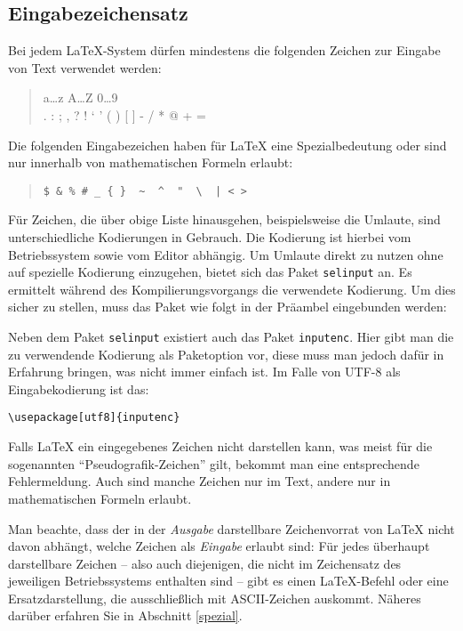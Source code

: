 \subsection{Eingabezeichensatz}\label{inputenc}

Bei jedem \LaTeX-System dürfen mindestens die folgenden Zeichen zur Eingabe von 
Text verwendet werden:
\begin{quote}
  \ttfamily
  a\dots z A\dots Z 0\dots 9 \\
  . : ; , ? ! ` ' ( ) [ ] - / * @ + =
\end{quote}
Die folgenden Eingabezeichen haben für \LaTeX{} eine Spezialbedeutung oder sind 
nur innerhalb von mathematischen Formeln erlaubt:
\begin{quote}
\verb.$ & % # _ { }  ~  ^  "  \  | < >.
\end{quote}
Für Zeichen, die über obige Liste hinausgehen, beispielsweise die Umlaute, sind 
unterschiedliche Kodierungen in
Gebrauch. Die Kodierung ist hierbei vom Betriebssystem sowie vom Editor 
abhängig. Um Umlaute direkt zu nutzen ohne auf spezielle Kodierung einzugehen,
bietet sich das Paket \texttt{selinput} an. Es ermittelt während des 
Kompilierungsvorgangs die verwendete Kodierung. Um dies sicher zu stellen, muss
das Paket wie folgt in der Präambel eingebunden werden:
\begin{example}[caption={Bestimmung der Kodierung für die Nutzung von Umlauten},]
 \usepackage{selinput}
 \usepackage[T1]{fontenc}
\end{example}

Neben dem Paket \texttt{selinput} existiert auch das Paket \texttt{inputenc}.
Hier gibt man die zu verwendende Kodierung als Paketoption vor, diese muss man
jedoch dafür in Erfahrung bringen, was nicht immer einfach ist. Im Falle von
UTF-8 als Eingabekodierung ist das:

\begin{beispiel}
	\lstinline+\usepackage[utf8]{inputenc}+
\end{beispiel}

Falls \LaTeX{} ein eingegebenes Zeichen nicht darstellen kann, was meist für die
sogenannten "`Pseudografik-Zeichen"' gilt,  bekommt man eine entsprechende 
Fehlermeldung. Auch sind manche Zeichen nur im Text, andere nur in 
mathematischen Formeln erlaubt.

Man beachte, dass der in der \emph{Ausgabe} darstellbare Zeichenvorrat von 
\LaTeX{} nicht davon abhängt, welche Zeichen als \emph{Eingabe} erlaubt sind:
Für jedes überhaupt darstellbare Zeichen -- also auch diejenigen, die nicht im 
Zeichensatz des jeweiligen Betriebssystems enthalten sind -- gibt es einen 
\LaTeX-Befehl oder eine Ersatzdarstellung, die ausschließlich mit ASCII-Zeichen 
auskommt.  Näheres darüber erfahren Sie in Abschnitt \ref{spezial}.

\endinput
